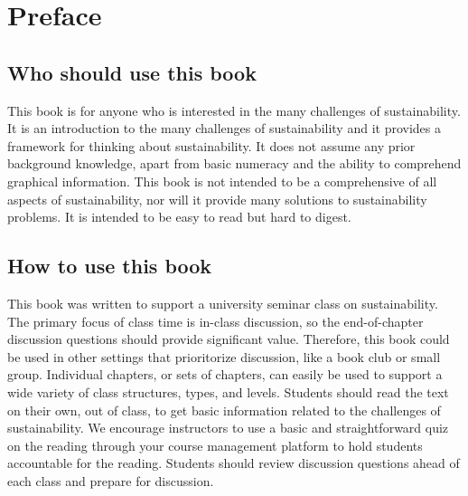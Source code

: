 {
\chapter*{Preface}
\thispagestyle{plain}

\noindent


\section*{Who should use this book} 

This book is for anyone who is interested in the many challenges of 
sustainability.
It is an introduction to the many challenges of sustainability
and it provides a framework for thinking about sustainability.
It does not assume any prior background knowledge,
apart from basic numeracy and the ability to comprehend graphical information.
This book is not intended to be a comprehensive of all aspects of sustainability,
nor will it provide many solutions to sustainability problems. 
It is intended to be easy to read but hard to digest.


\section*{How to use this book} 

This book was written to support a university seminar class %
on sustainability. 
The primary focus of class time is in-class discussion, so 
the end-of-chapter discussion questions should provide significant value. 
Therefore, this book could be used in other settings that prioritorize discussion,
like a book club or small group.
Individual chapters, or sets of chapters, can easily be
used to support a wide variety of class structures, types, and levels.
Students should read the text on their own, out of class, to get 
basic information related to  the challenges of sustainability. 
We encourage instructors to use a basic and straightforward quiz on the reading 
through your course management platform to hold students accountable for the 
reading. 
Students should review discussion questions ahead of each class and 
prepare for discussion.


}
